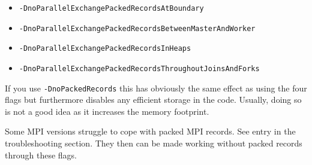 \begin{itemize}
  \item \texttt{-DnoParallelExchangePackedRecordsAtBoundary}
  \item \texttt{-DnoParallelExchangePackedRecordsBetweenMasterAndWorker}
  \item \texttt{-DnoParallelExchangePackedRecordsInHeaps}
  \item \texttt{-DnoParallelExchangePackedRecordsThroughoutJoinsAndForks}
\end{itemize}


\noindent
If you use \texttt{-DnoPackedRecords} this has obviously the same effect as
using the four flags but furthermore disables any efficient storage in the code.
Usually, doing so is not a good idea as it increases the memory footprint.


\begin{remark}
Some MPI versions struggle to cope with packed MPI records.
See entry in the troubleshooting section.
They then can be made working without packed records through these flags.
\end{remark}


